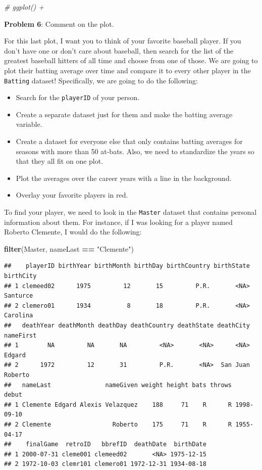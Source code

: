 \documentclass[
]{article}
\newenvironment{Shaded}{\begin{snugshade}}{\end{snugshade}}
\newcommand{\CommentTok}[1]{\textcolor[rgb]{0.56,0.35,0.01}{\textit{#1}}}
\newcommand{\KeywordTok}[1]{\textcolor[rgb]{0.13,0.29,0.53}{\textbf{#1}}}
\newcommand{\NormalTok}[1]{#1}
\newcommand{\OperatorTok}[1]{\textcolor[rgb]{0.81,0.36,0.00}{\textbf{#1}}}
\newcommand{\StringTok}[1]{\textcolor[rgb]{0.31,0.60,0.02}{#1}}
\providecommand{\tightlist}{%
  \setlength{\itemsep}{0pt}\setlength{\parskip}{0pt}}
\begin{document}
\begin{Shaded}
\begin{Highlighting}[]
    \CommentTok{# ggplot() +  }
\end{Highlighting}
\end{Shaded}

\textbf{Problem 6}: Comment on the plot.

For this last plot, I want you to think of your favorite baseball
player. If you don't have one or don't care about baseball, then search
for the list of the greatest baseball hitters of all time and choose
from one of those. We are going to plot their batting average over time
and compare it to every other player in the \texttt{Batting} dataset!
Specifically, we are going to do the following:

\begin{itemize}
\tightlist
\item
  Search for the \texttt{playerID} of your person.
\item
  Create a separate dataset just for them and make the batting average
  variable.
\item
  Create a dataset for everyone else that only contains batting averages
  for seasons with more than 50 at-bats. Also, we need to standardize
  the years so that they all fit on one plot.
\item
  Plot the averages over the career years with a line in the background.
\item
  Overlay your favorite players in red.
\end{itemize}

To find your player, we need to look in the \texttt{Master} dataset that
contains personal information about them. For instance, if I was looking
for a player named Roberto Clemente, I would do the following:

\begin{Shaded}
\begin{Highlighting}[]
\KeywordTok{filter}\NormalTok{(Master, nameLast }\OperatorTok{==}\StringTok{ "Clemente"}\NormalTok{)}
\end{Highlighting}
\end{Shaded}

\begin{verbatim}
##    playerID birthYear birthMonth birthDay birthCountry birthState birthCity
## 1 clemeed02      1975         12       15         P.R.       <NA>  Santurce
## 2 clemero01      1934          8       18         P.R.       <NA>  Carolina
##   deathYear deathMonth deathDay deathCountry deathState deathCity nameFirst
## 1        NA         NA       NA         <NA>       <NA>      <NA>    Edgard
## 2      1972         12       31         P.R.       <NA>  San Juan   Roberto
##   nameLast               nameGiven weight height bats throws      debut
## 1 Clemente Edgard Alexis Velazquez    188     71    R      R 1998-09-10
## 2 Clemente                 Roberto    175     71    R      R 1955-04-17
##    finalGame  retroID   bbrefID  deathDate  birthDate
## 1 2000-07-31 cleme001 clemeed02       <NA> 1975-12-15
## 2 1972-10-03 clemr101 clemero01 1972-12-31 1934-08-18
\end{verbatim}
\end{document}
